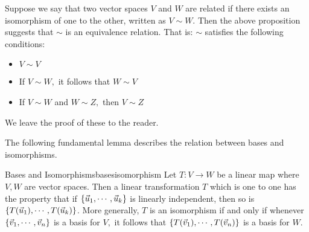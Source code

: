 Suppose we say that two vector spaces $V$ and $W$ are related if there exists an isomorphism of one to the other, written as $V\sim W$. 
Then the above proposition suggests that $\sim $ is an equivalence relation. That is: $\sim $
satisfies the following conditions:

\begin{itemize}
\item $V\sim V$

\item If $V\sim W,$ it follows that $W\sim V$

\item If $V\sim W$ and $W\sim Z,$ then $V\sim Z$
\end{itemize}

We leave the proof of these to the reader. 

The following fundamental lemma describes the relation between bases and
isomorphisms.

\begin{lemma}{Bases and Isomorphisms}{basesisomorphism}
Let $T:V\rightarrow W$ be a
 linear map where $V,W$ are vector spaces.  Then a linear transformation $T$ which is one to one has the property that
if $\left\{ \vec{u}_{1},\cdots ,\vec{u}_{k}\right\} $ is linearly
independent, then so is $\left\{ T(\vec{u}_{1}),\cdots ,T(\vec{u}_{k})\right\} $.
 More generally, $T$ is an
isomorphism if and only if whenever $\left\{ 
\vec{v}_{1},\cdots ,\vec{v}_{n}\right\} $ is a basis for $V,$ it follows
that $\left\{ T(\vec{v}_{1}),\cdots ,T(\vec{v}_{n})\right\} $ is a basis for $W$.
\end{lemma}

